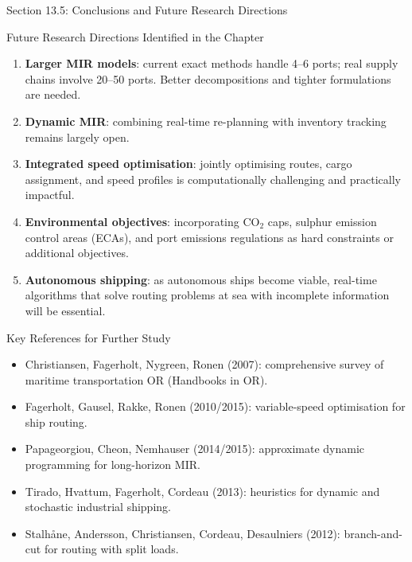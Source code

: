 \documentclass[aspectratio=169,10pt]{beamer}
\begin{document}
\begin{frame}[allowframebreaks]{Section 13.5: Conclusions and Future Research Directions}
  \begin{alertblock}{Future Research Directions Identified in the Chapter}
    \begin{enumerate}
      \item \textbf{Larger MIR models}: current exact methods handle 4--6 ports;
            real supply chains involve 20--50 ports.  Better decompositions
            and tighter formulations are needed.
      \item \textbf{Dynamic MIR}: combining real-time re-planning with
            inventory tracking remains largely open.
      \item \textbf{Integrated speed optimisation}: jointly optimising routes,
            cargo assignment, and speed profiles is computationally challenging
            and practically impactful.
      \item \textbf{Environmental objectives}: incorporating CO$_2$ caps,
            sulphur emission control areas (ECAs), and port emissions
            regulations as hard constraints or additional objectives.
      \item \textbf{Autonomous shipping}: as autonomous ships become viable,
            real-time algorithms that solve routing problems at sea with
            incomplete information will be essential.
    \end{enumerate}
  \end{alertblock}

  \begin{block}{Key References for Further Study}
    \begin{itemize}
      \item Christiansen, Fagerholt, Nygreen, Ronen (2007): comprehensive
            survey of maritime transportation OR (Handbooks in OR).
      \item Fagerholt, Gausel, Rakke, Ronen (2010/2015): variable-speed
            optimisation for ship routing.
      \item Papageorgiou, Cheon, Nemhauser (2014/2015): approximate dynamic
            programming for long-horizon MIR.
      \item Tirado, Hvattum, Fagerholt, Cordeau (2013): heuristics for
            dynamic and stochastic industrial shipping.
      \item Stalh\aa ne, Andersson, Christiansen, Cordeau, Desaulniers (2012):
            branch-and-cut for routing with split loads.
    \end{itemize}
  \end{block}
\end{frame}
\end{document}
